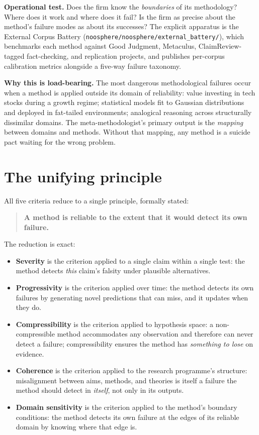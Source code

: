 \documentclass[11pt,letterpaper]{article}
\newcommand{\file}[1]{\texttt{#1}}
\begin{document}
\textbf{Operational test.} Does the firm know the \emph{boundaries} of its methodology? Where does it work and where does it fail? Is the firm as precise about the method's failure modes as about its successes? The explicit apparatus is the External Corpus Battery (\file{noosphere/noosphere/external\_battery/}), which benchmarks each method against Good Judgment, Metaculus, ClaimReview-tagged fact-checking, and replication projects, and publishes per-corpus calibration metrics alongside a five-way failure taxonomy.

\textbf{Why this is load-bearing.} The most dangerous methodological failures occur when a method is applied outside its domain of reliability: value investing in tech stocks during a growth regime; statistical models fit to Gaussian distributions and deployed in fat-tailed environments; analogical reasoning across structurally dissimilar domains. The meta-methodologist's primary output is the \emph{mapping} between domains and methods. Without that mapping, any method is a suicide pact waiting for the wrong problem.

\section{The unifying principle}

All five criteria reduce to a single principle, formally stated:

\begin{quote}
\textbf{A method is reliable to the extent that it would detect its own failure.}
\end{quote}

The reduction is exact:

\begin{itemize}[leftmargin=1.5em,itemsep=0.2em]
\item \textbf{Severity} is the criterion applied to a single claim within a single test: the method detects \emph{this} claim's falsity under plausible alternatives.
\item \textbf{Progressivity} is the criterion applied over time: the method detects its own failures by generating novel predictions that can miss, and it updates when they do.
\item \textbf{Compressibility} is the criterion applied to hypothesis space: a non-compressible method accommodates any observation and therefore can never detect a failure; compressibility ensures the method has \emph{something to lose} on evidence.
\item \textbf{Coherence} is the criterion applied to the research programme's structure: misalignment between aims, methods, and theories is itself a failure the method should detect in \emph{itself}, not only in its outputs.
\item \textbf{Domain sensitivity} is the criterion applied to the method's boundary conditions: the method detects its own failure at the edges of its reliable domain by knowing where that edge is.
\end{itemize}
\end{document}
